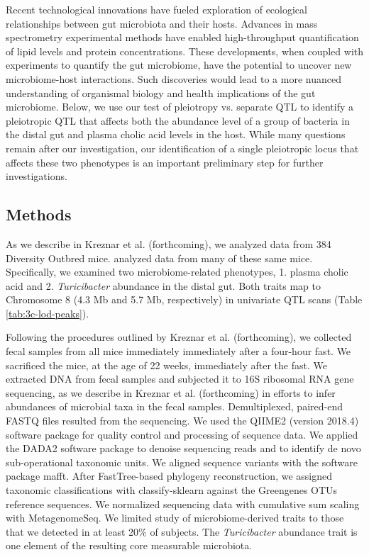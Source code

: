 \documentclass{book}
\begin{document}
Recent technological innovations have fueled exploration of ecological relationships between gut microbiota and their hosts. Advances in mass spectrometry experimental methods have enabled high-throughput quantification of lipid levels and protein concentrations. These developments, when coupled with experiments to quantify the gut microbiome, have the potential to uncover new microbiome-host interactions. Such discoveries would lead to a more nuanced understanding of organismal biology and health implications of the gut microbiome. Below, we use our test of pleiotropy vs. separate QTL to identify a pleiotropic QTL that affects both the abundance level of a group of bacteria in the distal gut and plasma cholic acid levels in the host. While many questions remain after our investigation, our identification of a single pleiotropic locus that affects these two phenotypes is an important preliminary step for further investigations.  



\subsection{Methods}

As we describe in Kreznar et al. (forthcoming), we analyzed data from 384 Diversity Outbred mice. \citet{keller2018genetic} analyzed data from many of these same mice. Specifically, we examined two microbiome-related phenotypes, 1. plasma cholic acid and 2. \emph{Turicibacter} abundance in the distal gut. Both traits map to Chromosome 8 (4.3 Mb and 5.7 Mb, respectively) in univariate QTL scans (Table \ref{tab:3c-lod-peaks}).

Following the procedures outlined by Kreznar et al. (forthcoming), we collected fecal samples from all mice immediately immediately after a four-hour fast. We sacrificed the mice, at the age of 22 weeks, immediately after the fast. We extracted DNA from fecal samples and subjected it to 16S ribosomal RNA gene sequencing, as we describe in Kreznar et al. (forthcoming) in efforts to infer abundances of microbial taxa in the fecal samples. Demultiplexed, paired-end FASTQ files resulted from the sequencing. We used the QIIME2 (version 2018.4) software package for quality control and processing of sequence data. We applied the DADA2 software package to denoise sequencing reads and to identify de novo sub-operational taxonomic units. We aligned sequence variants with the software package mafft. After FastTree-based phylogeny reconstruction, we assigned taxonomic classifications with classify-sklearn against the Greengenes OTUs reference sequences. We normalized sequencing data with cumulative sum scaling with MetagenomeSeq. We limited study of microbiome-derived traits to those that we detected in at least 20\% of subjects. The \emph{Turicibacter} abundance trait is one element of the resulting core measurable microbiota. 
\end{document}
